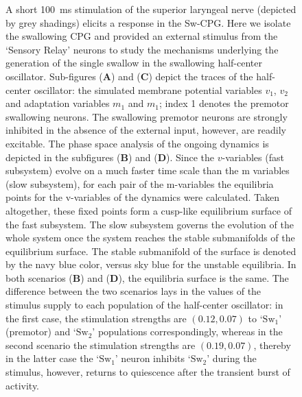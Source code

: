\documentclass[pdflatex,sn-mathphys-ay]{sn-jnl}%
\theoremstyle{thmstyleone}%
\theoremstyle{thmstyletwo}%
\theoremstyle{thmstylethree}%
\begin{document}
\begin{figure}
 \begin{center}
 \end{center}
 \caption{A short 100~ms stimulation of the superior laryngeal nerve (depicted by grey shadings) elicits a response in the Sw-CPG. Here we isolate the swallowing CPG and provided an external stimulus from the `Sensory Relay' neurons to study the mechanisms underlying the generation of the single swallow in the swallowing half-center oscillator. Sub-figures (\textbf{A}) and (\textbf{C}) depict the traces of the half-center oscillator: the simulated membrane potential variables $v_1$, $v_2$ and adaptation variables $m_1$ and $m_1$; index 1 denotes the premotor swallowing neurons. The swallowing premotor neurons are strongly inhibited in the absence of the external input, however, are readily excitable. 
 The phase space analysis of the ongoing dynamics is depicted in the subfigures (\textbf{B}) and (\textbf{D}). Since the $v$-variables (fast subsystem) evolve on a much faster time scale than the m variables (slow subsystem), for each pair of the m-variables the equilibria points for the v-variables of the dynamics were calculated. Taken altogether, these fixed points form a cusp-like equilibrium surface of the fast subsystem. The slow subsystem governs the evolution of the whole system once the system reaches the stable submanifolds of the equilibrium surface. The stable submanifold of the surface is denoted by the navy blue color, versus sky blue for the unstable equilibria. 
 In both scenarios (\textbf{B}) and (\textbf{D}), the equilibria surface is the same. The difference between the two scenarios lays in the values of the stimulus supply to each population of the half-center oscillator: in the first case, the stimulation strengths are $(0.12, 0.07)$ to `$\text{Sw}_1$' (premotor) and `$\text{Sw}_2$' populations correspondingly, whereas in the second scenario the stimulation strengths are $(0.19, 0.07)$, thereby in the latter case the `$\text{Sw}_1$' neuron inhibits `$\text{Sw}_2$' during the stimulus, however, returns to quiescence after the transient burst of activity.
}\label{fig: PIR_mechanism}
\end{figure}
\end{document}
